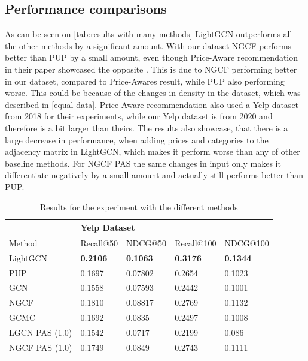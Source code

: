 \subsection{Performance comparisons}\label{subsec:performance-com}
As can be seen on \autoref{tab:results-with-many-methods} LightGCN outperforms all the other methods by a significant amount.
With our dataset NGCF performs better than PUP by a small amount, even though Price-Aware recommendation in their paper showcased the opposite \cite{Priceaware}.
This is due to NGCF performing better in our dataset, compared to Price-Awares result, while PUP also performing worse.
This could be because of the changes in density in the dataset, which was described in \autoref{equal-data}.
Price-Aware recommendation also used a Yelp dataset from 2018 for their experiments, while our Yelp dataset is from 2020 and therefore is a bit larger than theirs.
The results also showcase, that there is a large decrease in performance, when adding prices and categories to the adjacency matrix in LightGCN, which makes it perform worse than any of other baseline methods.
For NGCF PAS the same changes in input only makes it differentiate negatively by a small amount and actually still performs better than PUP.
\begin{table}[h!]
    \centering
    \begin{tabular}{|l|l|l|l|l|}
        \hline
        \rowcolor[HTML]{FFFFFF}
                       & \multicolumn{4}{l|}{\cellcolor[HTML]{FFFFFF}Yelp Dataset}                                                       \\ \hline
        Method         & Recall@50                                                 & NDCG@50         & Recall@100      & NDCG@100        \\ \hline
        LightGCN       & \textbf{0.2106}                                           & \textbf{0.1063} & \textbf{0.3176} & \textbf{0.1344} \\ \hline
        PUP            & 0.1697                                                    & 0.07802         & 0.2654          & 0.1023          \\ \hline
        GCN            & 0.1558                                                    & 0.07593         & 0.2442          & 0.1001          \\ \hline
        NGCF           & 0.1810                                                    & 0.08817         & 0.2769          & 0.1132          \\ \hline
        GCMC           & 0.1692                                                    & 0.0835          & 0.2497          & 0.1008          \\ \hline
        LGCN PAS (1.0) & 0.1542                                                    & 0.0717          & 0.2199          & 0.086           \\ \hline
        NGCF PAS (1.0) & 0.1749                                                    & 0.0849          & 0.2743          & 0.1111          \\ \hline
    \end{tabular}
    \caption{Results for the experiment with the different methods}
    \label{tab:results-with-many-methods}
\end{table}
